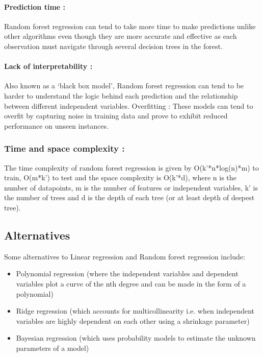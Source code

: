 \documentclass{article}
\begin{document}
\paragraph{Prediction time :} Random forest regression can tend to take more time to make predictions unlike other algorithms even though they are more accurate and effective as each observation must navigate through several decision trees in the forest.
\paragraph{Lack of interpretability : }Also known as a ‘black box model’, Random forest regression can tend to be harder to understand the logic behind each prediction and the relationship between different independent variables.
Overfitting : These models can tend to overfit by capturing noise in training data and prove to exhibit reduced performance on unseen instances.

\subsubsection{Time and space complexity : }
The time complexity of random forest regression is given by O(k’*n*log(n)*m) to train, O(m*k’) to test and the space complexity is O(k’*d), where n is the number of datapoints, m is the number of features or independent variables, k’ is the number of trees and d is the depth of each tree (or at least depth of deepest tree).

\subsection{Alternatives}
Some alternatives to Linear regression and Random forest regression include: 
\begin{itemize}
\item Polynomial regression (where the independent variables and dependent variables plot a curve of the nth degree and can be made in the form of a polynomial)

\item Ridge regression (which accounts for multicollinearity i.e. when independent variables are highly dependent on each other using a shrinkage parameter)

\item Bayesian regression (which uses probability models to estimate the unknown parameters of a model) 
\end{itemize}
\end{document}
